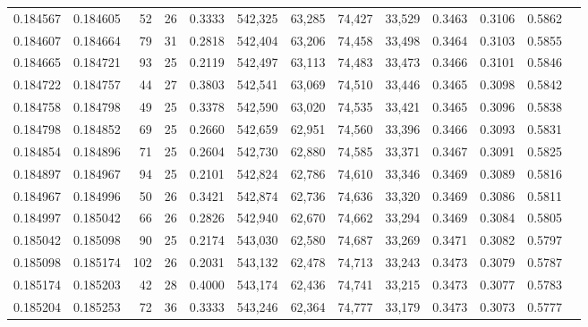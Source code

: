 \begin{tabular}{rrrrrrrrrrrrr}
0.184567 & 0.184605 &    52 &  26 &                                     0.3333 & 542,325 &  63,285 &  74,427 &  33,529 & 0.3463 & 0.3106 & 0.5862 \\
0.184607 & 0.184664 &    79 &  31 &                                     0.2818 & 542,404 &  63,206 &  74,458 &  33,498 & 0.3464 & 0.3103 & 0.5855 \\
0.184665 & 0.184721 &    93 &  25 &                                     0.2119 & 542,497 &  63,113 &  74,483 &  33,473 & 0.3466 & 0.3101 & 0.5846 \\
0.184722 & 0.184757 &    44 &  27 &                                     0.3803 & 542,541 &  63,069 &  74,510 &  33,446 & 0.3465 & 0.3098 & 0.5842 \\
0.184758 & 0.184798 &    49 &  25 &                                     0.3378 & 542,590 &  63,020 &  74,535 &  33,421 & 0.3465 & 0.3096 & 0.5838 \\
0.184798 & 0.184852 &    69 &  25 &                                     0.2660 & 542,659 &  62,951 &  74,560 &  33,396 & 0.3466 & 0.3093 & 0.5831 \\
0.184854 & 0.184896 &    71 &  25 &                                     0.2604 & 542,730 &  62,880 &  74,585 &  33,371 & 0.3467 & 0.3091 & 0.5825 \\
0.184897 & 0.184967 &    94 &  25 &                                     0.2101 & 542,824 &  62,786 &  74,610 &  33,346 & 0.3469 & 0.3089 & 0.5816 \\
0.184967 & 0.184996 &    50 &  26 &                                     0.3421 & 542,874 &  62,736 &  74,636 &  33,320 & 0.3469 & 0.3086 & 0.5811 \\
0.184997 & 0.185042 &    66 &  26 &                                     0.2826 & 542,940 &  62,670 &  74,662 &  33,294 & 0.3469 & 0.3084 & 0.5805 \\
0.185042 & 0.185098 &    90 &  25 &                                     0.2174 & 543,030 &  62,580 &  74,687 &  33,269 & 0.3471 & 0.3082 & 0.5797 \\
0.185098 & 0.185174 &   102 &  26 &                                     0.2031 & 543,132 &  62,478 &  74,713 &  33,243 & 0.3473 & 0.3079 & 0.5787 \\
0.185174 & 0.185203 &    42 &  28 &                                     0.4000 & 543,174 &  62,436 &  74,741 &  33,215 & 0.3473 & 0.3077 & 0.5783 \\
0.185204 & 0.185253 &    72 &  36 &                                     0.3333 & 543,246 &  62,364 &  74,777 &  33,179 & 0.3473 & 0.3073 & 0.5777 \\

\end{tabular}
